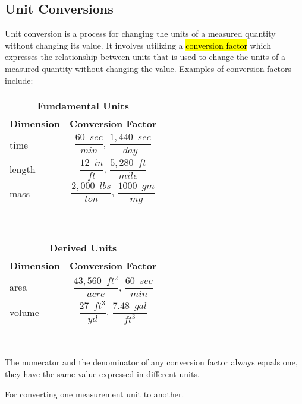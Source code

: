 \subsection{Unit Conversions}
Unit conversion is a process for changing the units of a measured quantity without changing its value.  It involves 
utilizing a \hl{conversion factor} which expresses the relationship between units that is used to change the units of a measured quantity without changing the value. Examples of conversion factors include:\\

\begin{center}
\renewcommand{\arraystretch}{1.5}
\vspace{0.5cm}
\begin{tabular}{l| c c }
\hline
\multicolumn{2}{c}{\textbf{Fundamental Units}} \\
\hline
\textbf{Dimension} & \textbf{Conversion Factor}\\[0.5cm]

\hspace{0.3cm}
time & $\dfrac{60 \enspace sec}{min}$, $\dfrac{1,440\enspace sec}{day}$\\[0.5cm]
length & $\dfrac{12 \enspace in}{ft}$, $\dfrac{5,280 \enspace ft}{mile}$\\[0.5cm]
mass & $\dfrac{2,000 \enspace lbs}{ton}$, $\dfrac{1000 \enspace gm}{mg}$\\
\end{tabular}\\
\begin{tabular}{l| c c }
\hline
\multicolumn{2}{c}{\textbf{Derived Units}} \\
\hline
\textbf{Dimension} & \textbf{Conversion Factor}\\[0.5cm]

\hspace{0.3cm}
area & $\dfrac{43,560 \enspace ft^2}{acre}$, $\dfrac{60 \enspace sec}{min}$\\[0.5cm]
volume & $\dfrac{27 \enspace ft^3}{yd}$, $\dfrac{7.48 \enspace gal}{ft^3}$\\
\end{tabular}\\
\end{center}
\vspace{0.5cm}

The numerator and the denominator of any conversion factor always equals one, they have the same value expressed in different units.

For converting one measurement unit to another.

